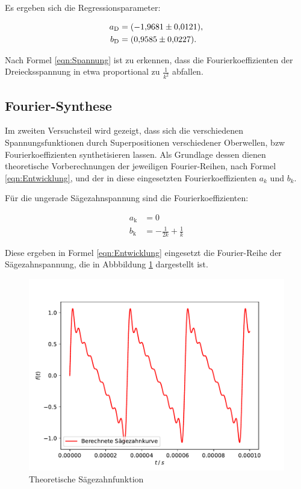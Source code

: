 Es ergeben sich die Regressionsparameter:

\begin{align*}
    a_\text{D} &= \SI{-1.9681 \pm 0.0121}{}, \\
    b_\text{D} &= \SI{0.9585 \pm 0.0227}{}.
\end{align*}

Nach Formel \eqref{eqn:Spannung} ist zu erkennen, dass die Fourierkoeffizienten der Dreiecksspannung in etwa
proportional zu $\frac{1}{k^2}$ abfallen.


\subsection{Fourier-Synthese}

Im zweiten Versuchsteil wird gezeigt, dass sich die verschiedenen Spannungsfunktionen
durch Superpositionen verschiedener Oberwellen, bzw Fourierkoeffizienten synthetisieren
lassen. Als Grundlage dessen dienen theoretische Vorberechnungen der jeweiligen
Fourier-Reihen, nach Formel \eqref{eqn:Entwicklung}, und der in diese eingesetzten
Fourierkoeffizienten $a_k$ und $b_k$.

Für die ungerade Sägezahnspannung sind die Fourierkoeffizienten:

\begin{align*}
    a_\text{k} &= 0 \\
    b_\text{k} &= - \frac{1}{2k} + \frac{1}{k}
\end{align*}

Diese ergeben in Formel \eqref{eqn:Entwicklung} eingesetzt die Fourier-Reihe
der Sägezahnspannung, die in Abbbildung \ref{fig:Theo1} dargestellt ist.

\begin{figure}[H]
    \centering
    \includegraphics[scale = 0.6]{content/plot4.pdf}
    \caption{Theoretische Sägezahnfunktion}
    \label{fig:Theo1}
\end{figure}

